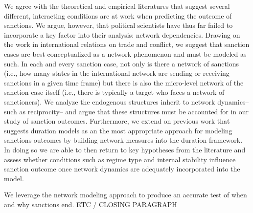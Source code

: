 We agree with the theoretical and empirical literatures that suggest several different, interacting conditions are at work when predicting the outcome of sanctions. We argue, however, that political scientists have thus far failed to incorporate a key factor into their analysis: network dependencies. Drawing on the work in international relations on trade and conflict, we suggest that sanction cases are best conceptualized as a network phenomenon and must be modeled as such. In each and every sanction case, not only is there a network of sanctions (i.e., how many states in the international network are sending or receiving sanctions in a given time frame) but there is also the micro-level network of the sanction case itself (i.e., there is typically a target who faces a network of sanctioners). We analyze the endogenous structures inherit to network dynamics--such as reciprocity-- and argue that these structures must be accounted for in our study of sanction outcomes. Furthermore, we extend on previous work that suggests duration models as an the most appropriate approach for modeling sanctions outcomes by building network measures into the duration framework. In doing so we are able to then return to key hypotheses from the literature and assess whether conditions such as regime type and internal stability influence sanction outcome once network dynamics are adequately incorporated into the model. 

We leverage the network modeling approach to produce an accurate test of when and why sanctions end. ETC / CLOSING PARAGRAPH
